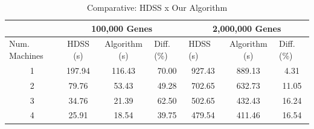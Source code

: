 \documentclass[journal]{IEEEtran}
\begin{document}
\begin{table}[htb]
\centering
\caption{Comparative: HDSS x Our Algorithm}
\begin{scriptsize}
\begin{tabular}{c|c|c|c|c|c|c|}
\cline{2-7}
\multicolumn{1}{l|}{}                 & \multicolumn{3}{c|}{100,000 Genes}                              & \multicolumn{3}{c|}{2,000,000 Genes}                                                  \\ \hline
\multicolumn{1}{|l|}{Num. Machines} & HDSS (s) & Algorithm (s) & \multicolumn{1}{l|}{Diff. (\%)} & \multicolumn{1}{l|}{HDSS (s)} & Algorithm (s) & \multicolumn{1}{l|}{Diff. (\%)} \\ \hline
\multicolumn{1}{|c|}{1 }       &197.94     & 116.43              & 70.00                         & 927.43                         & 889.13              &           4.31                 \\ \hline
\multicolumn{1}{|c|}{2 }      & 79.76     & 53.43              & 49.28                            & 702.65                          & 632.73              & 11.05                           \\ \hline
\multicolumn{1}{|c|}{3 }      & 34.76     & 21.39              & 62.50                            & 502.65                          & 432.43             &               16.24                  \\ \hline
\multicolumn{1}{|c|}{4 }      & 25.91     & 18.54              & 39.75                            & 479.54                          & 411.46             &               16.54  \\ \hline
\end{tabular}
\end{scriptsize}
\label{table: gene}
\end{table}
\end{document}
